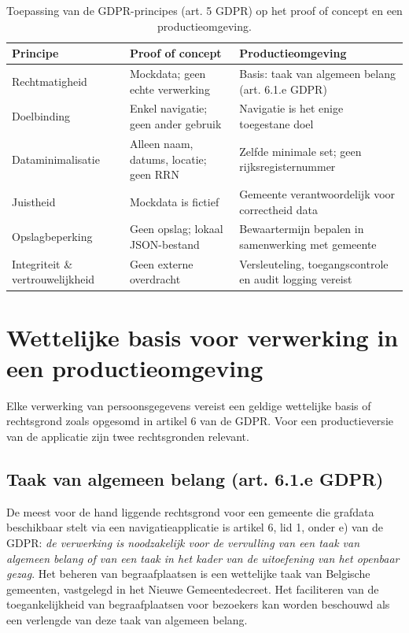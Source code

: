 \begin{table}[h]
    \centering
    \caption[GDPR-principes toegepast op de applicatie]{Toepassing van de GDPR-principes (art. 5 GDPR) op het proof of concept en een productieomgeving.}
    \label{tab:gdpr-beginselen}
    \renewcommand{\arraystretch}{1.4}
    \begin{tabular}{p{3cm} p{4.5cm} p{4.5cm}}
        \hline
        \textbf{Principe} & \textbf{Proof of concept} & \textbf{Productieomgeving} \\
        \hline
        Rechtmatigheid & Mockdata; geen echte verwerking & Basis: taak van algemeen belang (art. 6.1.e GDPR) \\
        \hline
        Doelbinding & Enkel navigatie; geen ander gebruik & Navigatie is het enige toegestane doel \\
        \hline
        Dataminimalisatie & Alleen naam, datums, locatie; geen RRN & Zelfde minimale set; geen rijksregisternummer \\
        \hline
        Juistheid & Mockdata is fictief & Gemeente verantwoordelijk voor correctheid data \\
        \hline
        Opslagbeperking & Geen opslag; lokaal JSON-bestand & Bewaartermijn bepalen in samenwerking met gemeente \\
        \hline
        Integriteit \& vertrouwelijkheid & Geen externe overdracht & Versleuteling, toegangscontrole en audit logging vereist \\
        \hline
    \end{tabular}
\end{table}

\section{Wettelijke basis voor verwerking in een productieomgeving}

Elke verwerking van persoonsgegevens vereist een geldige wettelijke basis of rechtsgrond zoals opgesomd in artikel 6 van de GDPR. Voor een productieversie van de applicatie zijn twee rechtsgronden relevant.

\subsection{Taak van algemeen belang (art. 6.1.e GDPR)}

De meest voor de hand liggende rechtsgrond voor een gemeente die grafdata beschikbaar stelt via een navigatieapplicatie is artikel 6, lid 1, onder e) van de GDPR: \textit{de verwerking is noodzakelijk voor de vervulling van een taak van algemeen belang of van een taak in het kader van de uitoefening van het openbaar gezag}. Het beheren van begraafplaatsen is een wettelijke taak van Belgische gemeenten, vastgelegd in het Nieuwe Gemeentedecreet. Het faciliteren van de toegankelijkheid van begraafplaatsen voor bezoekers kan worden beschouwd als een verlengde van deze taak van algemeen belang.

